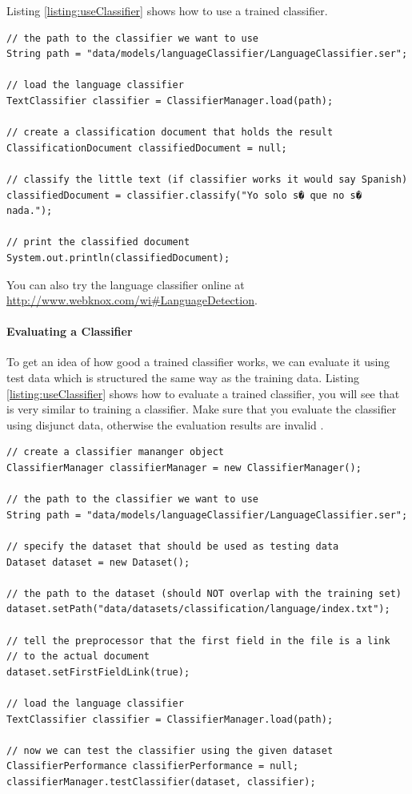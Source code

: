 \documentclass[a4paper,twoside]{book}      %
\begin{document}
Listing \ref{listing:useClassifier} shows how to use a trained classifier.

\begin{codelisting}
\label{listing:useClassifier}
\begin{lstlisting}[frame=tb]
// the path to the classifier we want to use
String path = "data/models/languageClassifier/LanguageClassifier.ser";

// load the language classifier
TextClassifier classifier = ClassifierManager.load(path);

// create a classification document that holds the result
ClassificationDocument classifiedDocument = null;

// classify the little text (if classifier works it would say Spanish)
classifiedDocument = classifier.classify("Yo solo s� que no s� nada.");

// print the classified document
System.out.println(classifiedDocument);
\end{lstlisting}
\end{codelisting}

You can also try the language classifier online at \url{http://www.webknox.com/wi#LanguageDetection}.

\paragraph{Evaluating a Classifier}
To get an idea of how good a trained classifier works, we can evaluate it using test data which is structured the same way as the training data. Listing \ref{listing:useClassifier} shows how to evaluate a trained classifier, you will see that is very similar to training a classifier. Make sure that you evaluate the classifier using disjunct data, otherwise the evaluation results are invalid .

\begin{codelisting}
\label{listing:useClassifier}
\begin{lstlisting}[frame=tb]
// create a classifier mananger object
ClassifierManager classifierManager = new ClassifierManager();

// the path to the classifier we want to use
String path = "data/models/languageClassifier/LanguageClassifier.ser";

// specify the dataset that should be used as testing data
Dataset dataset = new Dataset();

// the path to the dataset (should NOT overlap with the training set)
dataset.setPath("data/datasets/classification/language/index.txt");

// tell the preprocessor that the first field in the file is a link
// to the actual document
dataset.setFirstFieldLink(true);

// load the language classifier
TextClassifier classifier = ClassifierManager.load(path);

// now we can test the classifier using the given dataset
ClassifierPerformance classifierPerformance = null;
classifierManager.testClassifier(dataset, classifier);
\end{lstlisting}
\end{codelisting}
\end{document}
